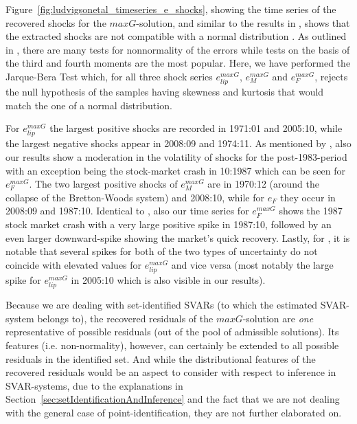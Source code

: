 \documentclass[a4paper,11pt,listof=nochaptergap,oneside,pointednumbers,bibtotoc,bigheadings,liststotoc,hidelinks]{scrbook}
\theoremstyle{mysatz}
\theoremstyle{mydefinition}
\theoremstyle{mytheorem}
\theoremstyle{mybemerkung}
\begin{document}
Figure~\ref{fig:ludvigsonetal_timeseries_e_shocks}, showing the time series of the recovered shocks for the $maxG$-solution, and similar to the results in \citet{ludvigsonetal:19}, shows that the extracted shocks are not compatible with a normal distribution \citep{ludvigsonetal:19}. As outlined in \citet{lutkepohlkilian:17}, there are many tests for nonnormality of the errors while tests on the basis of the third and fourth moments are the most popular. Here, we have performed the Jarque-Bera Test which, for all three shock series $e_{lip}^{maxG}$, $e_{M}^{maxG}$ and $e_{F}^{maxG}$, rejects the null hypothesis of the samples having skewness and kurtosis that would match the one of a normal distribution. 

For $e_{lip}^{maxG}$ the largest positive shocks are recorded in 1971:01 and 2005:10, while the largest negative shocks appear in 2008:09 and 1974:11. As mentioned by \citet{ludvigsonetal:19}, also our results show a moderation in the volatility of shocks for the post-1983-period with an exception being the stock-market crash in 10:1987 which can be seen for $e_{F}^{maxG}$. The two largest positive shocks of $e_{M}^{maxG}$ are in 1970:12 (around the collapse of the Bretton-Woods system) and 2008:10, while for $e_{F}$ they occur in 2008:09 and 1987:10. Identical to \citet{ludvigsonetal:19}, also our time series for $e_{F}^{maxG}$ shows the 1987 stock market crash with a very large positive spike in 1987:10, followed by an even larger downward-spike showing the market's quick recovery. Lastly, for \citet{ludvigsonetal:19}, it is notable that several spikes for both of the two types of uncertainty do not coincide with elevated values for $e_{lip}^{maxG}$ and vice versa (most notably the large spike for $e_{lip}^{maxG}$ in 2005:10 which is also visible in our results).

Because we are dealing with set-identified SVARs (to which the estimated SVAR-system belongs to), the recovered residuals of the $maxG$-solution are \textit{one} representative of possible residuals (out of the pool of admissible solutions). Its features (i.e. non-normality), however, can certainly be extended to all possible residuals in the identified set. And while the distributional features of the recovered residuals would be an aspect to consider with respect to inference in SVAR-systems, due to the explanations in Section~\ref{sec:setIdentificationAndInference} and the fact that we are not dealing with the general case of point-identification, they are not further elaborated on.
\end{document}
